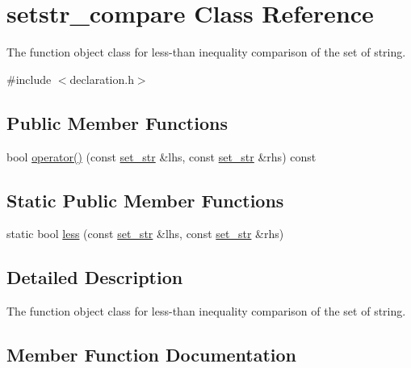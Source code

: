 \hypertarget{classsetstr__compare}{}\section{setstr\+\_\+compare Class Reference}
\label{classsetstr__compare}


The function object class for less-\/than inequality comparison of the set of string.  




{\ttfamily \#include $<$declaration.\+h$>$}

\subsection*{Public Member Functions}
\begin{DoxyCompactItemize}
\item 
bool \hyperlink{classsetstr__compare_a8180b5f59a596a9f1b4faa8ff04f947a}{operator()} (const \hyperlink{typedef_8h_aa234bdb39b1698c1d4955072cfb3195f}{set\+\_\+str} \&lhs, const \hyperlink{typedef_8h_aa234bdb39b1698c1d4955072cfb3195f}{set\+\_\+str} \&rhs) const 
\end{DoxyCompactItemize}
\subsection*{Static Public Member Functions}
\begin{DoxyCompactItemize}
\item 
static bool \hyperlink{classsetstr__compare_a13434772bcc27130c092e34bad37b101}{less} (const \hyperlink{typedef_8h_aa234bdb39b1698c1d4955072cfb3195f}{set\+\_\+str} \&lhs, const \hyperlink{typedef_8h_aa234bdb39b1698c1d4955072cfb3195f}{set\+\_\+str} \&rhs)
\end{DoxyCompactItemize}


\subsection{Detailed Description}
The function object class for less-\/than inequality comparison of the set of string. 

\subsection{Member Function Documentation}
